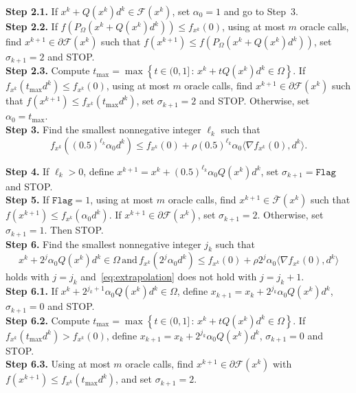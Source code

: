 \documentclass[11pt]{article}
\begin{document}
\begin{mdframed}
\noindent\textbf{Step 2.1.} If $x^{k}+Q(x^{k})d^{k} \in \mathcal{F}(x^{k})$, set $\alpha_0=1$ and go to Step~3.
\\[0.2cm]
\noindent\textbf{Step 2.2.} If $f(P_{\Omega}(x^k+Q(x^{k})d^{k})) \leq f_{x^{k}}(0)$, using at most $m$ oracle calls, find $x^{k+1} \in \partial \mathcal{F}(x^{k})$ such that $f(x^{k+1}) \leq f(P_{\Omega}(x^k+Q(x^k) d^k))$, set $\sigma_{k+1}=2$ and STOP.
\\[0.2cm]
\noindent\textbf{Step 2.3.} Compute $t_{\max}=\max\left\{t\in (0,1]\,:\,x^{k}+t Q(x^{k})d^{k}\in\Omega\right\}$. If $f_{x^k}(t_{\max} d^k) \leq f_{x^{k}}(0)$, using at most $m$ oracle calls, find $x^{k+1} \in \partial \mathcal{F}(x^{k})$ such that $f(x^{k+1}) \leq f_{x^k}(t_{\max} d^k)$, set $\sigma_{k+1}=2$ and STOP. Otherwise, set $\alpha_0 = t_{\max}$.
\\[0.2cm]
\noindent\textbf{Step 3.} Find the smallest nonnegative integer $\ell_{k}$ such that
\begin{equation} \label{eq:2.21}
f_{x^k}((0.5)^{\ell_{k}} \alpha_0 d^k) \leq f_{x^{k}}(0)+\rho (0.5)^{\ell_{k}} \alpha_0 \langle\nabla f_{x^{k}}(0),d^{k}\rangle.
\end{equation}

\noindent\textbf{Step 4.} If $\ell_k>0$, define $x^{k+1}=x^k+(0.5)^{\ell_{k}} \alpha_0 Q(x^k) d^k$, set $\sigma_{k+1}=\texttt{Flag}$ and STOP.
\\[0.2cm]

\noindent\textbf{Step 5.} If $\texttt{Flag}=1$, using at most $m$ oracle calls, find $x^{k+1} \in \overline{\mathcal{F}}(x^k)$ such that $f(x^{k+1}) \leq f_{x^k}(\alpha_0 d^k)$. If $x^{k+1} \in \partial \mathcal{F}(x^k)$, set $\sigma_{k+1}=2$. Otherwise, set $\sigma_{k+1}=1$. Then STOP.
\\[0.2cm]

\noindent\textbf{Step 6.} Find the smallest nonnegative integer $j_{k}$ such that
\begin{equation} \label{eq:extrapolation}
x^{k}+2^{j}\alpha_{0}Q(x^{k})d^{k}\in\Omega\,\text{and}\, f_{x^{k}}(2^{j}\alpha_{0}d^{k})\leq f_{x^{k}}(0)+\rho 2^{j} \alpha_{0}\langle\nabla f_{x^{k}}(0),d^{k}\rangle
\end{equation}
holds with $j=j_k$ and~\eqref{eq:extrapolation} does not hold with $j=j_k+1$.
\\[0.2cm]

\noindent\textbf{Step 6.1.} If $x^{k}+2^{j_{k}+1}\alpha_{0}Q(x^{k})d^{k}\in\Omega$, define $x_{k+1}=x_{k}+2^{j_{k}}\alpha_{0}Q(x^{k})d^{k}$, $\sigma_{k+1}=0$ and STOP.
\\[0.2cm]

\noindent\textbf{Step 6.2.} Compute $t_{\max}=\max\left\{t\in (0,1]\,:\,x^{k}+t Q(x^{k})d^{k}\in\Omega\right\}$. If $f_{x^{k}}(t_{\max} d^{k}) > f_{x^{k}}(0)$, define $x_{k+1}=x_{k}+2^{j_{k}}\alpha_{0}Q(x^{k})d^{k}$, $\sigma_{k+1}=0$ and STOP.
\\[0.2cm]

\noindent\textbf{Step 6.3.} Using at most $m$ oracle calls, find $x^{k+1} \in \partial \mathcal{F}(x^k)$ with $f(x^{k+1}) \leq f_{x^k}(t_{\max} d^k)$, and set $\sigma_{k+1}=2$.
\end{mdframed}
\end{document}
